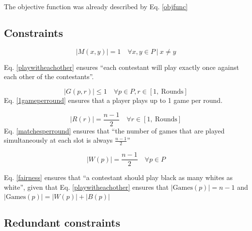 \documentclass[a4paper, 10pt]{article}
\begin{document}
The objective function was already described by Eq. \ref{objfunc}

\subsection{Constraints}

\begin{equation}
    \label{playwitheachother}
    |M(x,y)| = 1 \quad \forall x,y \in P \ | \  x \neq y
\end{equation}

Eq. \ref{playwitheachother} ensures ``each contestant will play exactly once against each other of the contestants''.


\begin{equation}
    \label{1gameperround}
    |G(p,r)| \leq 1 \quad \forall p \in P, r \in [1, \ \text{Rounds}] 
\end{equation}
Eq. \ref{1gameperround} ensures that a player plays up to 1 game per round.

\begin{equation}
    \label{matchesperround}
    |R(r)| = \frac{n-1}{2}  \quad \forall r \in [1,\ \text{Rounds}] 
\end{equation}
Eq. \ref{matchesperround} ensures that ``the number of games that are played simultaneously at each slot is always $\frac{n-1}{2}$''

\begin{equation}
    \label{fairness}
    |W(p)| = \frac{n-1}{2} \quad \forall p \in P
\end{equation}

Eq. \ref{fairness} ensures that ``a contestant should play black as many whites as white'', 
given that Eq. \ref{playwitheachother} ensures that $|\text{Games}(p)| = n - 1$ and $|\text{Games}(p)| = |W(p)| + |B(p)|$  

\subsection{Redundant constraints}
\label{subsec:redundant}
\end{document}

